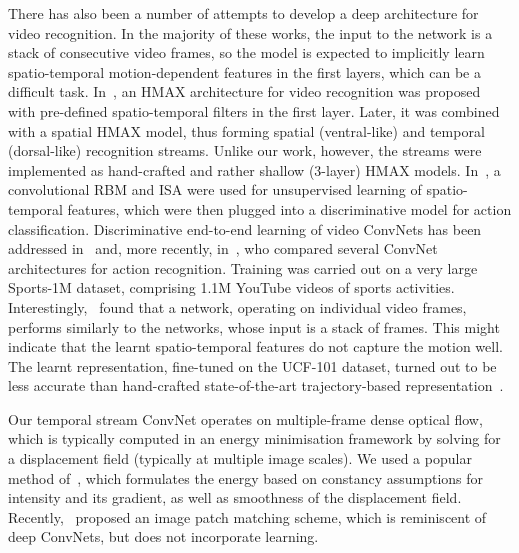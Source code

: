 \documentclass{article} \usepackage{nips14submit_e,times}
\begin{document}
There has also been a number of attempts to develop a deep architecture for video recognition. In the majority of these works, the input to the network is a stack of consecutive video
frames, so the model is expected to implicitly learn spatio-temporal motion-dependent features in the first layers, which can be a difficult task.
In~\cite{Jhuang07}, an HMAX architecture for video recognition was proposed with pre-defined spatio-temporal filters in the first layer.
Later, it was combined~\cite{Kuehne11} with a spatial HMAX model, thus forming spatial (ventral-like) and temporal (dorsal-like) recognition streams. 
Unlike our work, however, the streams were implemented as hand-crafted and rather shallow (3-layer) HMAX models.
In~\cite{Taylor10,Chen10,Le11}, a convolutional RBM and ISA were used for unsupervised learning of spatio-temporal features, which were then plugged into a discriminative model for action classification.
Discriminative end-to-end learning of video ConvNets has been addressed in~\cite{Ji13} and, more recently, in~\cite{Karpathy14}, who compared several ConvNet architectures for action recognition.
Training was carried out on a very large Sports-1M dataset, comprising 1.1M YouTube videos of sports activities.
Interestingly,~\cite{Karpathy14} found that a network, operating on individual video frames, performs similarly to the networks, whose input is a stack of frames.
This might indicate that the learnt spatio-temporal features do not capture the motion well.
The learnt representation, fine-tuned on the UCF-101 dataset, turned out to be  less accurate than hand-crafted state-of-the-art trajectory-based representation~\cite{Wang13c,Peng14}. 


Our temporal stream ConvNet operates on multiple-frame dense optical flow, which
is typically computed in an energy minimisation framework by solving for a displacement field (typically at multiple image scales). 
We used a popular method of~\cite{Brox04}, which formulates the energy based on constancy assumptions for intensity and its gradient, as well as smoothness of the
displacement field. Recently,~\cite{Weinzaepfel13} proposed an image patch matching scheme, which is reminiscent of deep ConvNets, but does not incorporate learning.
\end{document}
